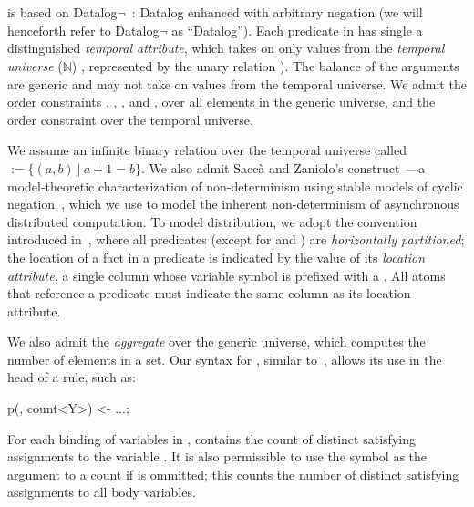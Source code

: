 \section{\large \bf \lang}
\label{sec:slang}

\lang is based on Datalog$\lnot$~\cite{ullmanbook}: Datalog enhanced with arbitrary negation (we will henceforth refer to Datalog$\lnot$ as ``Datalog'').  Each predicate in \lang has single a distinguished {\em temporal attribute}, which takes on only values from the {\em temporal universe} ($\mathbb{N}$)
, represented by the unary relation ).
The balance of the arguments are generic and may not take on values from the temporal universe.  We admit the order constraints \dedalus{<}, \dedalus{=}, \dedalus{!=}, and \dedalus{<=}, over all elements in the generic universe, and the order constraint \dedalus{<} over the temporal universe.

We assume an infinite binary relation over the temporal universe
called  $:= \{(a,b) \ | \ a + 1 = b\}$.  We also admit Sacc\`{a} and Zaniolo's  construct~\cite{sacca-zaniolo}---a model-theoretic characterization of non-determinism using stable models of cyclic negation~\cite{stable-model}, which we use to model the inherent non-determinism of asynchronous distributed computation.  To model distribution, we adopt the convention introduced in~\cite{Loo:2005}, where all predicates (except for  and ) are {\em horizontally partitioned};  the location of a fact in a predicate is indicated by the value of its {\em location attribute}, a single column whose variable symbol is prefixed with a \dedalus{\#}.  All atoms that reference a predicate must indicate the same column as its location attribute.

We also admit the  {\em aggregate} over the generic universe, which computes the number of elements in a set.  Our syntax for , similar to~\cite{datalog-agg}, allows its use in the head of a rule, such as:

\begin{Dedalus}
p(, count<Y>) <- ...;
\end{Dedalus}

For each binding of variables in ,  contains the count of distinct satisfying assignments to the variable .  It is also permissible to use the symbol \dedalus{*} as the argument to a count if  is ommitted; this counts the number of distinct satisfying assignments to all body variables.

